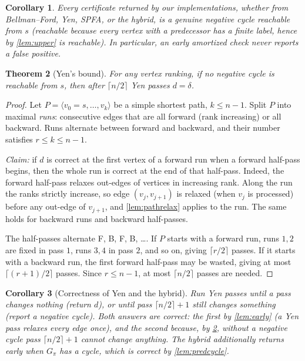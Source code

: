 \documentclass[11pt,a4paper]{article}
\newtheorem{theorem}{Theorem}
\newtheorem{corollary}[theorem]{Corollary}
\theoremstyle{definition}
\newcommand{\dd}{\mathit{d}}
\newcommand{\pred}{\pi}
\begin{document}
\begin{corollary}
Every certificate returned by our implementations, whether from Bellman--Ford, Yen, SPFA, or the hybrid, is a genuine negative cycle reachable from $s$ (reachable because every vertex with a predecessor has a finite label, hence by \cref{lem:upper} is reachable). In particular, an early amortized check never reports a false positive.
\end{corollary}

\begin{theorem}[Yen's bound]\label{thm:yen}
For any vertex ranking, if no negative cycle is reachable from $s$, then after $\lceil n/2\rceil$ Yen passes $\dd=\delta$.
\end{theorem}
\begin{proof}
Let $P=\langle v_0=s,\dots,v_k\rangle$ be a simple shortest path, $k\le n-1$. Split $P$ into maximal \emph{runs}: consecutive edges that are all forward ($\mathrm{rank}$ increasing) or all backward. Runs alternate between forward and backward, and their number satisfies $r\le k\le n-1$.

\emph{Claim:} if $\dd$ is correct at the first vertex of a forward run when a forward half-pass begins, then the whole run is correct at the end of that half-pass. Indeed, the forward half-pass relaxes out-edges of vertices in increasing rank. Along the run the ranks strictly increase, so edge $(v_j,v_{j+1})$ is relaxed (when $v_j$ is processed) before any out-edge of $v_{j+1}$, and \cref{lem:pathrelax} applies to the run. The same holds for backward runs and backward half-passes.

The half-passes alternate F, B, F, B, \dots. If $P$ starts with a forward run, runs $1,2$ are fixed in pass $1$, runs $3,4$ in pass $2$, and so on, giving $\lceil r/2\rceil$ passes. If it starts with a backward run, the first forward half-pass may be wasted, giving at most $\lceil (r+1)/2\rceil$ passes. Since $r\le n-1$, at most $\lceil n/2\rceil$ passes are needed.
\end{proof}

\begin{corollary}[Correctness of Yen and the hybrid]
Run Yen passes until a pass changes nothing (return $\dd$), or until pass $\lceil n/2\rceil+1$ still changes something (report a negative cycle). Both answers are correct: the first by \cref{lem:early} (a Yen pass relaxes every edge once), and the second because, by \cref{thm:yen}, without a negative cycle pass $\lceil n/2\rceil+1$ cannot change anything. The hybrid additionally returns early when $G_\pred$ has a cycle, which is correct by \cref{lem:predcycle}.
\end{corollary}
\end{document}
